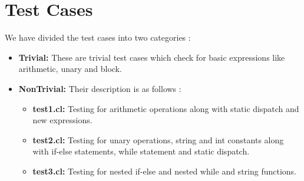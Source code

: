 \documentclass{article}
\begin{document}
\section{Test Cases}
We have divided the test cases into two categories :
\begin{itemize}
    \item \textbf{Trivial: }These are trivial test cases which check for basic expressions like arithmetic, unary and block.  
    \item \textbf{NonTrivial: }Their description is as follows :
    \begin{itemize}
        \item \textbf{test1.cl: }Testing for arithmetic operations along with static dispatch and new expressions.
        \item \textbf{test2.cl: }Testing for unary operations, string and int constants along with if-else statements, while statement and static dispatch.
        \item \textbf{test3.cl: }Testing for nested if-else and nested while and string functions. 
    \end{itemize}
\end{itemize}

\vspace{300px}
\end{document}
